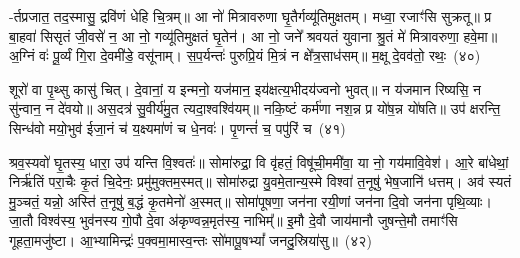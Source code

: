 -र्तप्रजात॒ तद॒स्मासु॒ द्रवि॑णं धेहि चि॒त्रम्॥ आ नो॑ मित्रावरुणा घृ॒तैर्गव्यू॑तिमुक्षतम्। मध्वा॒ रजाꣳ॑सि सुक्रतू॥ प्र बा॒हवा॑ सिसृतं जी॒वसे॑ न॒ आ नो॒ गव्यू॑तिमुक्षतं घृ॒तेन॑। आ नो॒ जने᳚ श्रवयतं युवाना श्रु॒तं मे॑ मित्रावरुणा॒ हवे॒मा॥ अ॒ग्निं वः॑ पू॒र्व्यं गि॒रा दे॒वमी॑डे॒ वसू॑नाम्। स॒प॒र्यन्तः॑ पुरुप्रि॒यं मि॒त्रं न क्षे᳚त्र॒साध॑सम्॥ म॒क्षू दे॒वव॑तो॒ रथः॒~(४०)

शूरो॑ वा पृ॒थ्सु कासु॑ चित्। दे॒वानां॒ य इन्मनो॒ यज॑मान॒ इय॑क्षत्य॒भीदय॑ज्वनो भुवत्॥ न य॑जमान रिष्यसि॒ न सु॑न्वान॒ न दे॑वयो॥ अस॒दत्र॑ सु॒वीर्य॑मु॒त त्यदा॒श्वश्वि॑यम्॥ नकि॒ष्टं कर्म॑णा नश॒न्न प्र यो॑ष॒न्न यो॑षति॥ उप॑ क्षरन्ति॒ सिन्ध॑वो मयो॒भुव॑ ईजा॒नं च॑ य॒क्ष्यमा॑णं च धे॒नवः॑। पृ॒णन्तं॑ च॒ पपु॑रिं च~(४१)

श्रव॒स्यवो॑ घृ॒तस्य॒ धारा॒ उप॑ यन्ति वि॒श्वतः॑॥ सोमा॑रुद्रा॒ वि वृ॑हतं॒ विषू॑ची॒ममी॑वा॒ या नो॒ गय॑मावि॒वेश॑। आ॒रे बा॑धेथां॒ निर्\mbox{}ऋ॑तिं परा॒चैः कृ॒तं चि॒देनः॒ प्रमु॑मुक्तम॒स्मत्॥ सोमा॑रुद्रा यु॒वमे॒तान्य॒स्मे विश्वा॑ त॒नूषु॑ भेष॒जानि॑ धत्तम्। अव॑ स्यतं मु॒ञ्चतं॒ यन्नो॒ अस्ति॑ त॒नूषु॑ ब॒द्धं कृ॒तमेनो॑ अ॒स्मत्॥ सोमा॑पूषणा॒ जन॑ना रयी॒णां जन॑ना दि॒वो जन॑ना पृथि॒व्याः। जा॒तौ विश्व॑स्य॒ भुव॑नस्य गो॒पौ दे॒वा अ॑कृण्वन्न॒मृत॑स्य॒ नाभिम्᳚॥ इ॒मौ दे॒वौ जाय॑मानौ जुषन्ते॒मौ तमाꣳ॑सि गूहता॒मजु॑ष्टा। आ॒भ्यामिन्द्रः॑ प॒क्वमा॒मास्व॒न्तः सो॑मापू॒ष\-भ्यां᳚ जनदु॒स्रिया॑सु॥~(४२)

{\anuvakamend[{बृ॒ह॒तः शव॑सा॒ रथः॒ पपु॑रिं च दि॒वो जन॑ना॒ पञ्च॑विꣳशतिश्च}]}%

